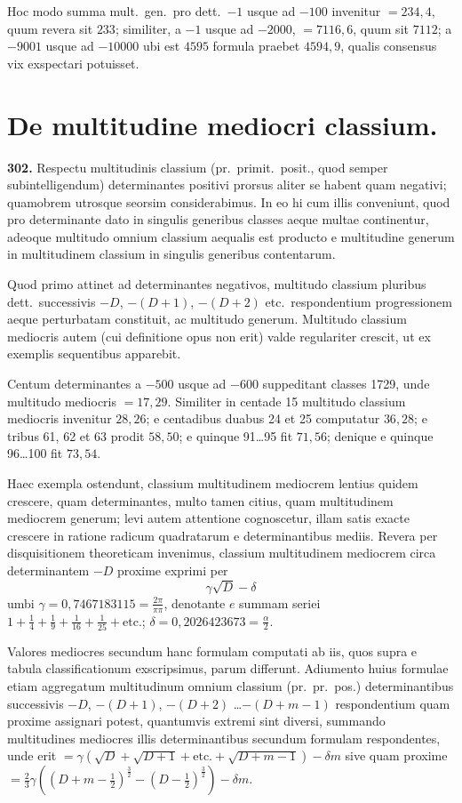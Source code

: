 \documentclass[12pt,a4paper]{article}
\theoremstyle{plain}
\theoremstyle{definition}
\theoremstyle{remark}
\begin{document}
Hoc modo summa mult.~gen.~pro dett.~$-1$ usque ad $-100$ invenitur $= 234{,}4$, quum revera sit $233$; similiter, a $-1$ usque ad $-2000$, $= 7116{,}6$, quum sit $7112$; a $-9001$ usque ad $-10000$ ubi est $4595$ formula praebet $4594{,}9$, qualis consensus vix exspectari potuisset.

\section*{De multitudine mediocri classium.}

\textbf{302.} Respectu multitudinis classium (pr.~primit.~posit., quod semper subintelligendum) determinantes positivi prorsus aliter se habent quam negativi; quamobrem utrosque seorsim considerabimus. In eo hi cum illis conveniunt, quod pro determinante dato in singulis generibus classes aeque multae continentur, adeoque multitudo omnium classium aequalis est producto e multitudine generum in multitudinem classium in singulis generibus contentarum.

Quod primo attinet ad determinantes negativos, multitudo classium pluribus dett.~successivis $-D$, $-(D+1)$, $-(D+2)$ etc.~respondentium progressionem aeque perturbatam constituit, ac multitudo generum. Multitudo classium mediocris autem (cui definitione opus non erit) valde regulariter crescit, ut ex exemplis sequentibus apparebit.

Centum determinantes a $-500$ usque ad $-600$ suppeditant classes 1729, unde multitudo mediocris $= 17{,}29$. Similiter in centade 15 multitudo classium mediocris invenitur $28{,}26$; e centadibus duabus 24 et 25 computatur $36{,}28$; e tribus 61, 62 et 63 prodit $58{,}50$; e quinque 91\ldots 95 fit $71{,}56$; denique e quinque 96\ldots 100 fit $73{,}54$.

Haec exempla ostendunt, classium multitudinem mediocrem lentius quidem crescere, quam determinantes, multo tamen citius, quam multitudinem mediocrem generum; levi autem attentione cognoscetur, illam satis exacte crescere in ratione radicum quadratarum e determinantibus mediis. Revera per disquisitionem theoreticam invenimus, classium multitudinem mediocrem circa determinantem $-D$ proxime exprimi per
\[
\gamma\sqrt{D} - \delta
\]
umbi $\gamma = 0{,}7467183115 = \tfrac{2\pi}{\pi\pi}$, denotante $e$ summam seriei $1 + \tfrac{1}{4} + \tfrac{1}{9} + \tfrac{1}{16} + \tfrac{1}{25} + \text{etc.}$; $\delta = 0{,}2026423673 = \tfrac{\alpha}{2}$.

Valores mediocres secundum hanc formulam computati ab iis, quos supra e tabula classificationum exscripsimus, parum differunt. Adiumento huius formulae etiam aggregatum multitudinum omnium classium (pr.~pr.~pos.) determinantibus successivis $-D$, $-(D+1)$, $-(D+2)$ \ldots $-(D+m-1)$ respondentium quam proxime assignari potest, quantumvis extremi sint diversi, summando multitudines mediocres illis determinantibus secundum formulam respondentes, unde erit $= \gamma(\sqrt{D} + \sqrt{D+1} + \text{etc.} + \sqrt{D+m-1}) - \delta m$ sive quam proxime $= \tfrac{2}{3}\gamma((D+m-\tfrac{1}{2})^{\frac{3}{2}} - (D-\tfrac{1}{2})^{\frac{3}{2}}) - \delta m$.
\end{document}
